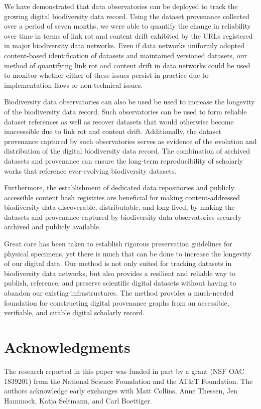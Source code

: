 We have demonstrated that data observatories can be deployed to track the growing digital biodiversity data record. Using the dataset provenance collected over a period of seven months, we were able to quantify the change in reliability over time in terms of link rot and content drift exhibited by the URLs registered in major biodiversity data networks. Even if data networks uniformly adopted content-based identification of datasets and maintained versioned datasets, our method of quantifying link rot and content drift in data networks could be used to monitor whether either of these issues persist in practice due to implementation flaws or non-technical issues.

Biodiversity data observatories can also be used be used to increase the longevity of the biodiversity data record. Such observatories can be used to form reliable dataset references as well as recover datasets that would otherwise become inaccessible due to link rot and content drift. Additionally, the dataset provenance captured by such observatories serves as evidence of the evolution and distribution of the digital biodiversity data record. The combination of archived datasets and provenance can ensure the long-term reproducibility of scholarly works that reference ever-evolving biodiversity datasets.

Furthermore, the establishment of dedicated data repositories and publicly accessible content hash registries are beneficial for making content-addressed biodiversity data discoverable, distributable, and long-lived, by making the datasets and provenance captured by biodiversity data observatories securely archived and publicly available.

Great care has been taken to establish rigorous preservation guidelines for physical specimens, yet there is much that can be done to increase the longevity of our digital data. Our method is not only suited for tracking datasets in biodiversity data networks, but also provides a resilient and reliable way to publish, reference, and preserve scientific digital datasets without having to abandon our existing infrastructures. The method provides a much-needed foundation for constructing digital provenance graphs from an accessible, verifiable, and citable digital scholarly record.


\section*{Acknowledgments}
The research reported in this paper was funded in part by a grant (NSF OAC 1839201) from the National Science Foundation and the AT\&T Foundation. The authors acknowledge early exchanges with Matt Collins, Anne Thessen, Jen Hammock, Katja Seltmann, and Carl Boettiger.

